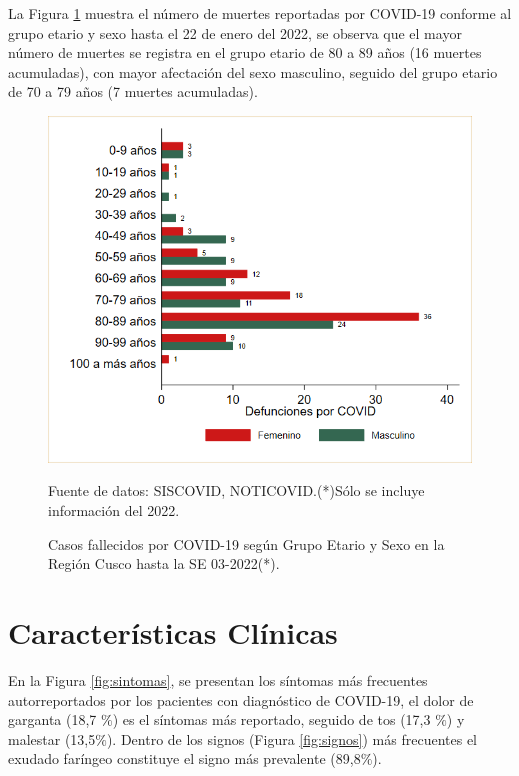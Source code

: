 \documentclass[12pt,a4paper,openany]{book}
\begin{document}
La Figura \ref{fig:fallecidos_edad_sexo}  muestra el número de muertes reportadas por COVID-19 conforme al grupo etario y sexo hasta el 22 de enero del 2022, se observa que el mayor número de muertes se registra en el grupo etario de 80 a 89 años (16 muertes acumuladas), con mayor afectación del sexo masculino, seguido del grupo etario de 70 a 79 años (7 muertes acumuladas). 

\begin{figure}[h]
	\caption{Casos fallecidos por COVID-19 según Grupo Etario y Sexo en la Región Cusco hasta la SE 03-2022(*).}\label{fig:fallecidos_edad_sexo}
	\begin{center}
		\includegraphics[width=0.75\linewidth]{../figuras/defunciones_etapavida_2022}
	\end{center}
	{\footnotesize {Fuente de datos: SISCOVID, NOTICOVID.(*)Sólo se incluye información del 2022.}}
\end{figure}



\cleardoublepage


\clearpage

\section*{Características Clínicas}


\noindent En la Figura \ref{fig:sintomas}, se presentan los síntomas más frecuentes autorreportados por los pacientes con diagnóstico de COVID-19, el dolor de garganta (18,7 $\%$) es el síntomas más reportado, seguido de tos (17,3 $\%$) y malestar (13,5$\%$). Dentro de los signos (Figura \ref{fig:signos}) más frecuentes el exudado faríngeo constituye el signo más prevalente (89,8$\%$). 
\end{document}
